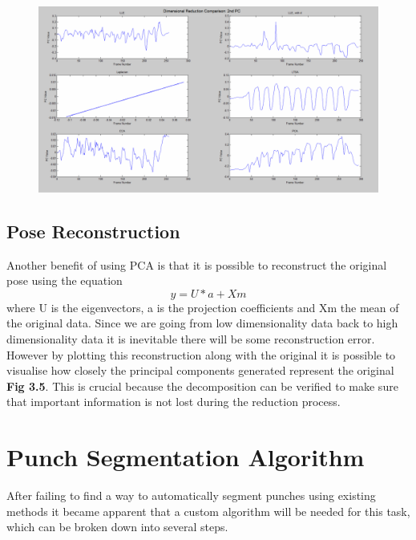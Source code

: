 \begin{figure}[h!]
    \centering
    \includegraphics[height=0.25\textheight]{fig04/drcomp2.pdf}
    \label{fig:drcomp}
\end{figure}\clearpage


\subsection{Pose Reconstruction}
Another benefit of using PCA is that it is possible to reconstruct the original pose using the equation $$y = U*a+Xm$$ where U is the eigenvectors, a is the projection coefficients and Xm the mean of the original data. Since we are going from low dimensionality data back to high dimensionality data it is inevitable there will be some reconstruction error. However by plotting this reconstruction along with the original it is possible to visualise how closely the principal components generated represent the original {\bf Fig 3.5}. This is crucial because the decomposition can be verified to make sure that important information is not lost during the reduction process.\qquad

\section{Punch Segmentation Algorithm}
After failing to find a way to automatically segment punches using existing methods it became apparent that a custom algorithm will be needed for this task, which can be broken down into several steps.

